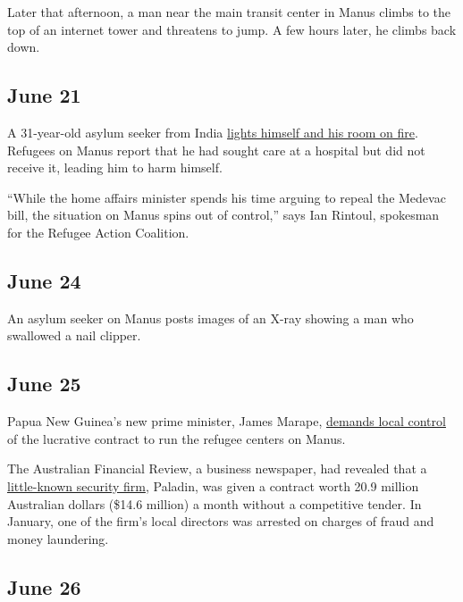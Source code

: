 Later that afternoon, a man near the main transit center in Manus climbs
to the top of an internet tower and threatens to jump. A few hours
later, he climbs back down.

\hypertarget{june-21}{%
\subsection{June 21}\label{june-21}}

A 31-year-old asylum seeker from India
\href{https://www.smh.com.au/national/man-sets-himself-on-fire-on-manus-island-after-being-denied-medical-treatment-20190621-p5204i.html}{lights
himself and his room on fire}. Refugees on Manus report that he had
sought care at a hospital but did not receive it, leading him to harm
himself.

``While the home affairs minister spends his time arguing to repeal the
Medevac bill, the situation on Manus spins out of control,'' says Ian
Rintoul, spokesman for the Refugee Action Coalition.

\hypertarget{june-24}{%
\subsection{June 24}\label{june-24}}

An asylum seeker on Manus posts images of an X-ray showing a man who
swallowed a nail clipper.

\hypertarget{june-25}{%
\subsection{June 25}\label{june-25}}

Papua New Guinea's new prime minister, James Marape,
\href{https://www.abc.net.au/news/2019-06-25/png-james-marape-wants-paladin-manus-contract-terminated/11245330}{demands
local control} of the lucrative contract to run the refugee centers on
Manus.

The Australian Financial Review, a business newspaper, had revealed that
a
\href{https://www.afr.com/news/policy/foreign-affairs/the-secretive-firm-earning-20-million-from-refugees-on-manus-island-20190210-h1b2sm}{little-known
security firm}, Paladin, was given a contract worth 20.9 million
Australian dollars (\$14.6 million) a month without a competitive
tender. In January, one of the firm's local directors was arrested on
charges of fraud and money laundering.

\hypertarget{june-26}{%
\subsection{June 26}\label{june-26}}

